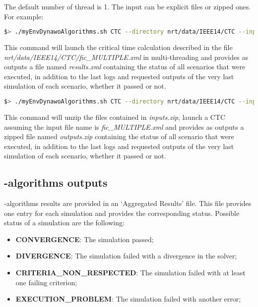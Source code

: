 \documentclass[a4paper, 12pt]{report}
\begin{document}
The default number of thread is 1. The input can be explicit files or zipped ones. For example:

\begin{lstlisting}[language=bash, breaklines=true, breakatwhitespace=false]
$> ./myEnvDynawoAlgorithms.sh CTC --directory nrt/data/IEEE14/CTC --input fic_MULTIPLE.xml --output results.xml --nbThreads 3
\end{lstlisting}

This command will launch the critical time calculation described in the file \textit{nrt/data/IEEE14/CTC/fic\_MULTIPLE.xml} in multi-threading 
and provides as outputs a file named \textit{results.xml} containing the status of all scenarios that were executed, 
in addition to the last logs and requested outputs of the very last simulation of each scenario, whether it passed or not.

\begin{lstlisting}[language=bash, breaklines=true, breakatwhitespace=false]
$> ./myEnvDynawoAlgorithms.sh CTC --directory nrt/data/IEEE14/CTC --input inputs.zip --output outputs.zip
\end{lstlisting}

This command will unzip the files contained in \textit{inputs.zip}, launch a CTC assuming the input file name is \textit{fic\_MULTIPLE.xml}
and provides as outputs a zipped file named \textit{outputs.zip} containing the status of all scenario that were executed, 
in addition to the last logs and requested outputs of the very last simulation of each scenario, whether it passed or not.\\

\subsection[Dynawo-algorithms outputs]{\Dynawo-algorithms outputs}
\label{Dynawo_algorithms_Outputs_AggrResults}

\Dynawo-algorithms results are provided in an `Aggregated Results' file. This file provides one entry for each simulation and provides the corresponding status.
Possible status of a simulation are the following:
\begin{itemize}
  \item \textbf{CONVERGENCE}: The simulation passed;
  \item \textbf{DIVERGENCE}: The simulation failed with a divergence in the solver;
  \item \textbf{CRITERIA\_NON\_RESPECTED}: The simulation failed with at least one failing criterion;
  \item \textbf{EXECUTION\_PROBLEM}: The simulation failed with another error;
\end{itemize}
\end{document}
